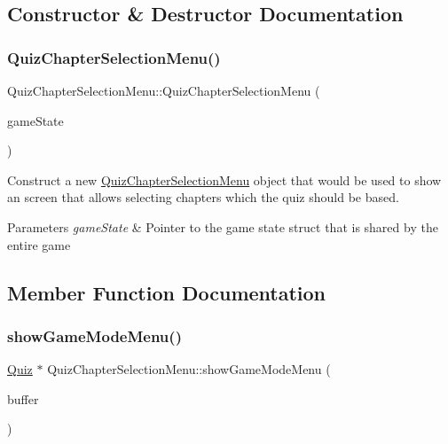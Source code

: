 \subsection{Constructor \& Destructor Documentation}
\mbox{\label{class_quiz_chapter_selection_menu_a825635a0dd17939087e46f91b83f6785}} 
\subsubsection{\texorpdfstring{QuizChapterSelectionMenu()}{QuizChapterSelectionMenu()}}
{\footnotesize\ttfamily Quiz\+Chapter\+Selection\+Menu\+::\+Quiz\+Chapter\+Selection\+Menu (\begin{DoxyParamCaption}\item[{\mbox{\hyperlink{struct_game_state}{Game\+State}} $\ast$}]{game\+State }\end{DoxyParamCaption})}



Construct a new \mbox{\hyperlink{class_quiz_chapter_selection_menu}{Quiz\+Chapter\+Selection\+Menu}} object that would be used to show an screen that allows selecting chapters which the quiz should be based. 


\begin{DoxyParams}{Parameters}
{\em game\+State} & Pointer to the game state struct that is shared by the entire game \\
\hline
\end{DoxyParams}


\subsection{Member Function Documentation}
\mbox{\label{class_quiz_chapter_selection_menu_ad1b6d7cabeb57060ce96bd53d2d9dc50}} 
\subsubsection{\texorpdfstring{showGameModeMenu()}{showGameModeMenu()}}
{\footnotesize\ttfamily \mbox{\hyperlink{class_quiz}{Quiz}} $\ast$ Quiz\+Chapter\+Selection\+Menu\+::show\+Game\+Mode\+Menu (\begin{DoxyParamCaption}\item[{B\+I\+T\+M\+AP $\ast$}]{buffer }\end{DoxyParamCaption})}



